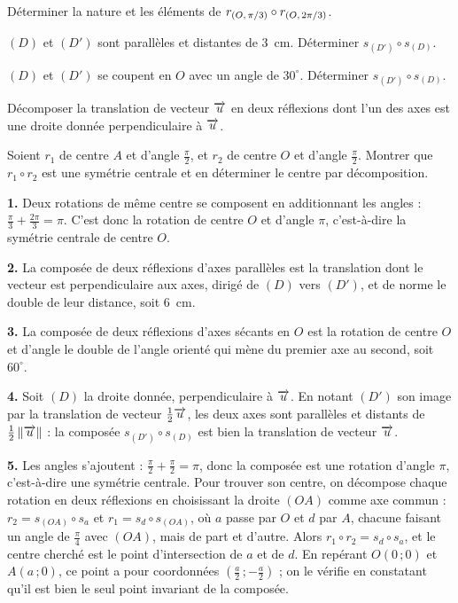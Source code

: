 \begin{entrainement}
\exo[\niveau{1}] Déterminer la nature et les éléments de
$r_{(O,\,\pi/3)} \circ r_{(O,\,2\pi/3)}$.

\exo[\niveau{2}] $(D)$ et $(D')$ sont parallèles et distantes de $3$~cm.
Déterminer $s_{(D')} \circ s_{(D)}$.

\exo[\niveau{2}] $(D)$ et $(D')$ se coupent en $O$ avec un angle de
$30^{\circ}$. Déterminer $s_{(D')} \circ s_{(D)}$.

\exo[\niveau{2}] Décomposer la translation de vecteur $\overrightarrow{u}$ en deux
réflexions dont l'un des axes est une droite donnée perpendiculaire à
$\overrightarrow{u}$.

\exo[\niveau{3}] Soient $r_{1}$ de centre $A$ et d'angle $\frac{\pi}{2}$, et
$r_{2}$ de centre $O$ et d'angle $\frac{\pi}{2}$. Montrer que
$r_{1} \circ r_{2}$ est une symétrie centrale et en déterminer le centre par
décomposition.
\end{entrainement}

\begin{corrige}
\textbf{1.} Deux rotations de même centre se composent en additionnant les
angles : $\frac{\pi}{3}+\frac{2\pi}{3} = \pi$. C'est donc la rotation de
centre $O$ et d'angle $\pi$, c'est-à-dire la symétrie centrale de centre $O$.

\textbf{2.} La composée de deux réflexions d'axes parallèles est la
translation dont le vecteur est perpendiculaire aux axes, dirigé de $(D)$ vers
$(D')$, et de norme le double de leur distance, soit $6$~cm.

\textbf{3.} La composée de deux réflexions d'axes sécants en $O$ est la
rotation de centre $O$ et d'angle le double de l'angle orienté qui mène du
premier axe au second, soit $60^{\circ}$.

\textbf{4.} Soit $(D)$ la droite donnée, perpendiculaire à $\overrightarrow{u}$. En notant
$(D')$ son image par la translation de vecteur $\frac12\overrightarrow{u}$, les deux axes
sont parallèles et distants de $\frac12\left\lVert \overrightarrow{u} \right\rVert$ : la composée
$s_{(D')} \circ s_{(D)}$ est bien la translation de vecteur $\overrightarrow{u}$.

\textbf{5.} Les angles s'ajoutent : $\frac{\pi}{2}+\frac{\pi}{2} = \pi$, donc
la composée est une rotation d'angle $\pi$, c'est-à-dire une symétrie
centrale. Pour trouver son centre, on décompose chaque rotation en deux
réflexions en choisissant la droite $(OA)$ comme axe commun :
$r_{2} = s_{(OA)} \circ s_{a}$ et $r_{1} = s_{d} \circ s_{(OA)}$, où $a$ passe
par $O$ et $d$ par $A$, chacune faisant un angle de $\frac{\pi}{4}$ avec
$(OA)$, mais de part et d'autre. Alors
$r_{1} \circ r_{2} = s_{d} \circ s_{a}$, et le centre cherché est le point
d'intersection de $a$ et de $d$. En repérant $O(0\,;0)$ et $A(a\,;0)$, ce
point a pour coordonnées $\left(\frac a2\,;-\frac a2\right)$ ; on le vérifie
en constatant qu'il est bien le seul point invariant de la composée.
\end{corrige}

